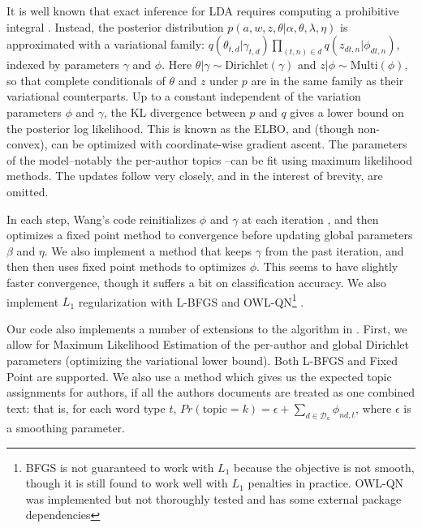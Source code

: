 \documentclass[14pt]{article} %
\theoremstyle{plain}
\theoremstyle{definition}
\theoremstyle{remark}
\begin{document}
\begin{appendix}
It is well known that exact inference for LDA requires computing a prohibitive integral \cite{Blei2003}. Instead, the posterior distribution $p(a,w,z,\theta|\alpha,\theta,\lambda,\eta)$ is approximated with a variational family: $q(\theta_{t,d}|\gamma_{t,d})\prod_{(t,n)\in d}q(z_{dt,n}|\phi_{dt,n})$, indexed by parameters $\gamma$ and $\phi$. Here $\theta|\gamma \sim\text{Dirichlet}(\gamma)$ and $z|\phi \sim\text{Multi}(\phi)$, so that complete conditionals of $\theta$ and $z$ under $p$ are in the same family as their variational counterparts. Up to a constant independent of the variation parameters $\phi$ and $\gamma$, the KL divergence between $p$ and $q$ gives a lower bound on the posterior log likelihood. This is known as the ELBO, and (though non-convex), can be optimized with coordinate-wise gradient ascent. The parameters of the model--notably the per-author topics --can be fit using maximum likelihood methods. The updates follow \cite{wang2009simultaneous} very closely, and in the interest of brevity, are omitted.

In each step, Wang's code reinitializes $\phi$ and $\gamma$ at each iteration \cite{wang2009simultaneous}, and then optimizes a fixed point method to convergence before updating global parameters $\beta$ and $\eta$. We also implement a method that keeps $\gamma$ from the past iteration, and then then uses fixed point methods to optimizes $\phi$. This seems to have slightly faster convergence, though it suffers a bit on classification accuracy. We also implement $L_1$ regularization with L-BFGS \cite{liu1989limited} and OWL-QN\footnote{BFGS is not guaranteed to work with $L_1$ because the objective is not smooth, though it is still found to work well with $L_1$ penalties in practice. OWL-QN was implemented but not thoroughly tested and has some external package dependencies} \cite{andrew2007scalable}.

Our code also implements a number of extensions to the algorithm in \cite{wang2009simultaneous}. First, we allow for Maximum Likelihood Estimation of the per-author and global Dirichlet parameters (optimizing the variational lower bound). Both L-BFGS and Fixed Point \cite{minka2000estimating} are supported. We also use a method which gives us the expected topic assignments for authors, if all the authors documents are treated as one combined text: that is, for each word type $t$, $Pr(\text{topic}=k) = \epsilon + \sum_{d\in \mathcal{D}_a}\phi_{nd,t}$, where $\epsilon$ is a smoothing parameter.


\end{appendix}
\end{document}
